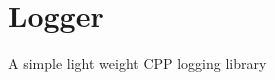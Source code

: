 \chapter{Logger }
\hypertarget{md__r_e_a_d_m_e}{}\label{md__r_e_a_d_m_e}
\label{md__r_e_a_d_m_e_autotoc_md0}%
%


A simple light weight CPP logging library 
